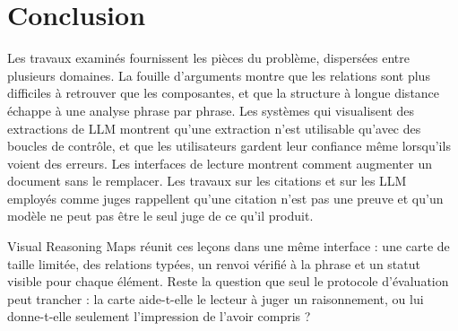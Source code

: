\section{Conclusion}
\label{sec:conclusion}

Les travaux examinés fournissent les pièces du problème, dispersées entre plusieurs domaines. La fouille d’arguments montre que les relations sont plus difficiles à retrouver que les composantes, et que la structure à longue distance échappe à une analyse phrase par phrase. Les systèmes qui visualisent des extractions de LLM montrent qu’une extraction n’est utilisable qu’avec des boucles de contrôle, et que les utilisateurs gardent leur confiance même lorsqu’ils voient des erreurs. Les interfaces de lecture montrent comment augmenter un document sans le remplacer. Les travaux sur les citations et sur les LLM employés comme juges rappellent qu’une citation n’est pas une preuve et qu’un modèle ne peut pas être le seul juge de ce qu’il produit.

Visual Reasoning Maps réunit ces leçons dans une même interface : une carte de taille limitée, des relations typées, un renvoi vérifié à la phrase et un statut visible pour chaque élément. Reste la question que seul le protocole d’évaluation peut trancher : la carte aide-t-elle le lecteur à juger un raisonnement, ou lui donne-t-elle seulement l’impression de l’avoir compris ?
